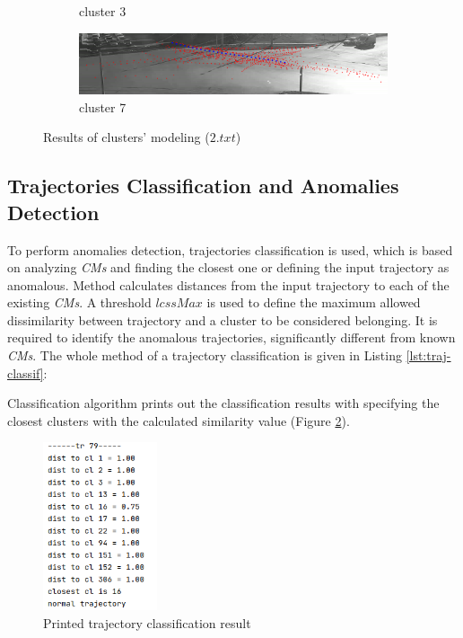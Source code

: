 \begin{figure}[!htb]
\begin{subfigure}[!htb]{0.7\textwidth}
		\caption{cluster 3}
	\end{subfigure}
	\hfill
	\begin{subfigure}[!htb]{0.7\textwidth}
		\centering{}
		\includegraphics[width=\textwidth]{images/cm-7-from-8-0_95.png}
		\caption{cluster 7}
	\end{subfigure}
	
	\caption{Results of clusters' modeling ($2.txt$)}
	\label{fig:cm-res}
\end{figure}

\subsection{Trajectories Classification and Anomalies Detection}

To perform anomalies detection, trajectories classification is used, which is based on analyzing \textit{CMs} and finding the closest one or defining the input trajectory as anomalous. Method calculates distances from the input trajectory to each of the existing \textit{CMs}. A threshold $lcssMax$ is used to define the maximum allowed dissimilarity between trajectory and a cluster to be considered belonging. It is required to identify the anomalous trajectories, significantly different from known \textit{CMs}. The whole method of a trajectory classification is given in Listing \ref{lst:traj-classif}:



Classification algorithm prints out the classification results with specifying the closest clusters with the calculated similarity value (Figure \ref{fig:classif-res-print}).

\begin{figure}[!htb]
	\centering{}
	\includegraphics[width=0.3\textwidth]{images/classif-res/classif-res-print.png}
	\caption{Printed trajectory classification result}
	\label{fig:classif-res-print}
\end{figure}